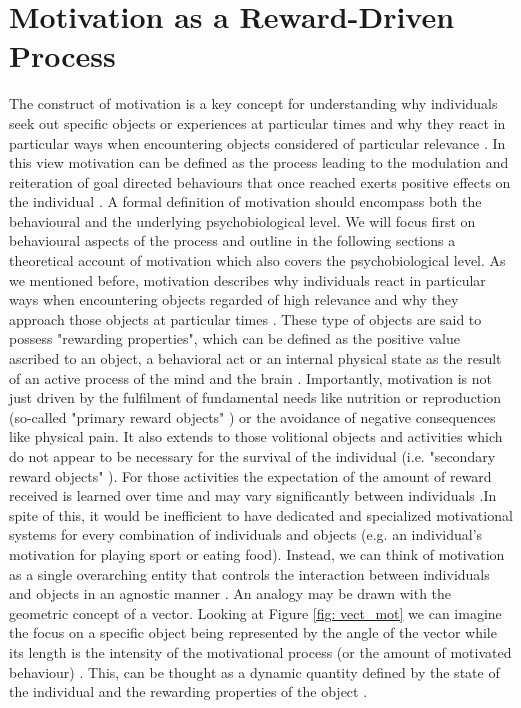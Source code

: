 \section{Motivation as a Reward-Driven Process}
\label{motivation}
The construct of motivation is a key concept for understanding why individuals seek out specific objects or experiences at particular times and why they react in particular ways when encountering objects considered of particular relevance \cite{berridge2004motivation}. In this view motivation can be defined as the process leading to the modulation and reiteration of goal directed behaviours that once reached exerts positive effects on the individual \cite{simpson2016behavioral}. A formal definition of motivation should encompass both the behavioural and the underlying psychobiological level. We will focus first on behavioural aspects of the process and outline in the following sections a theoretical account of motivation which also covers the psychobiological level. As we mentioned before, motivation describes why individuals react in particular ways when encountering objects regarded of high relevance and why they approach those objects at particular times \cite{berridge2004motivation}. These type of objects are said to possess "rewarding properties", which can be defined as the positive value ascribed to an object, a behavioral act or an internal physical state as the result of an active process of the mind and the brain \cite{schultz1997neural,berridge2008affective}. Importantly, motivation is not just driven by the fulfilment of fundamental needs like nutrition or reproduction (so-called "primary reward objects" \cite{schultz2000reward}) or the avoidance of negative consequences like physical pain. It also extends to those volitional objects and activities which do not appear to be necessary for the survival of the individual (i.e. "secondary reward objects" \cite{berridge2008affective,sescousse2013processing}). For those activities the expectation of the amount of reward received is learned over time and may vary significantly between individuals \cite{berridge2008affective,simpson2016behavioral}.In spite of this, it would be inefficient to have dedicated and specialized motivational systems for every combination of individuals and objects (e.g. an individual's motivation for playing sport or eating food). Instead, we can think of motivation as a single overarching entity that controls the interaction between individuals and objects in an agnostic manner \cite{simpson2016behavioral}. An analogy may be drawn with the geometric concept of a vector. Looking at Figure \ref{fig: vect_mot} we can imagine the focus on a specific object being represented by the angle of the vector while its length is the intensity of the motivational process (or the amount of motivated behaviour) \cite{simpson2016behavioral}. This, can be thought as a dynamic quantity defined by the state of the individual and the rewarding properties of the object \cite{toates1994comparing,berridge2004motivation,zhang2009neural}.

